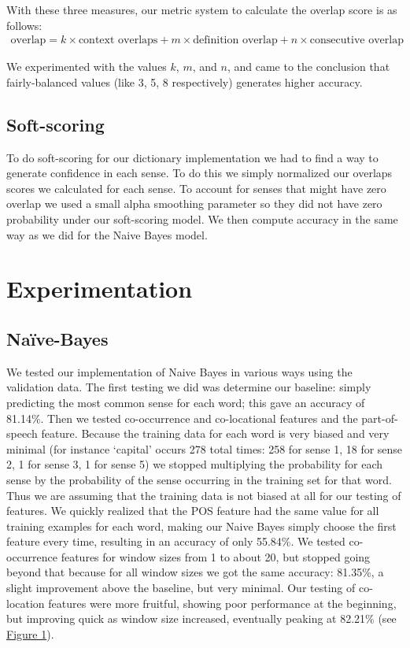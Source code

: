 \documentclass{article}
\begin{document}
With these three measures, our metric system to calculate the overlap score is as follows:
\begin{align}
\text{overlap} = k\times\text{context overlaps} + m\times\text{definition overlap} + n\times\text{consecutive overlap}
\end{align}

We experimented with the values $k$, $m$, and $n$, and came to the conclusion that fairly-balanced values (like 3, 5, 8 respectively) generates higher accuracy.

\subsection{Soft-scoring}
To do soft-scoring for our dictionary implementation we had to find a way to generate confidence in each sense. To do this we simply normalized our overlaps scores we calculated for each sense. To account for senses that might have zero overlap we used a small alpha smoothing parameter so they did not have zero probability under our soft-scoring model. We then compute accuracy in the same way as we did for the Naive Bayes model.

\section{Experimentation}

\subsection{Na\"{i}ve-Bayes}

We tested our implementation of Naive Bayes in various ways using the validation data. The first testing we did was determine our baseline: simply predicting the most common sense for each word; this gave an accuracy of 81.14\%. Then we tested co-occurrence and co-locational features and the part-of-speech feature. Because the training data for each word is very biased and very minimal (for instance `capital' occurs 278 total times: 258 for sense 1, 18 for sense 2, 1 for sense 3, 1 for sense 5) we stopped multiplying the probability for each sense by the probability of the sense occurring in the training set for that word. Thus we are assuming that the training data is not biased at all for our testing of features. We quickly realized that the POS feature had the same value for all training examples for each word, making our Naive Bayes simply choose the first feature every time, resulting in an accuracy of only 55.84\%. We tested co-occurrence features for window sizes from 1 to about 20, but stopped going beyond that because for all window sizes we got the same accuracy: 81.35\%, a slight improvement above the baseline, but very minimal. Our testing of co-location features were more fruitful, showing poor performance at the beginning, but improving quick as window size increased, eventually peaking at 82.21\% (see \hyperref[fig:col]{Figure 1}).
\end{document}
